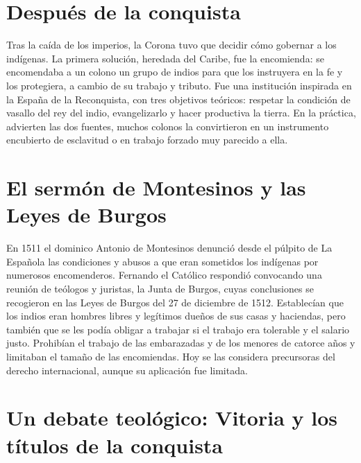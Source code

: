 \documentclass{book}
\begin{document}

\section{Después de la conquista}

Tras la caída de los imperios, la Corona tuvo que decidir cómo gobernar a los indígenas. La primera solución, heredada del Caribe, fue la encomienda: se encomendaba a un colono un grupo de indios para que los instruyera en la fe y los protegiera, a cambio de su trabajo y tributo. Fue una institución inspirada en la España de la Reconquista, con tres objetivos teóricos: respetar la condición de vasallo del rey del indio, evangelizarlo y hacer productiva la tierra. En la práctica, advierten las dos fuentes, muchos colonos la convirtieron en un instrumento encubierto de esclavitud o en trabajo forzado muy parecido a ella.


\section{El sermón de Montesinos y las Leyes de Burgos}

En 1511 el dominico Antonio de Montesinos denunció desde el púlpito de La Española las condiciones y abusos a que eran sometidos los indígenas por numerosos encomenderos. Fernando el Católico respondió convocando una reunión de teólogos y juristas, la Junta de Burgos, cuyas conclusiones se recogieron en las Leyes de Burgos del 27 de diciembre de 1512. Establecían que los indios eran hombres libres y legítimos dueños de sus casas y haciendas, pero también que se les podía obligar a trabajar si el trabajo era tolerable y el salario justo. Prohibían el trabajo de las embarazadas y de los menores de catorce años y limitaban el tamaño de las encomiendas. Hoy se las considera precursoras del derecho internacional, aunque su aplicación fue limitada.


\section{Un debate teológico: Vitoria y los títulos de la conquista}
\end{document}
